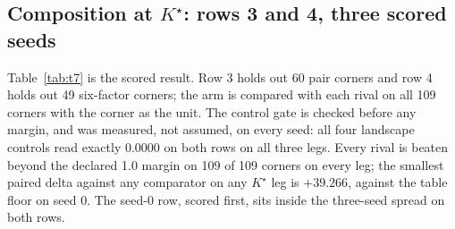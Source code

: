 \documentclass{article} %
\newcommand{\Kstar}{\ensuremath{K^{\star}}}
\begin{document}
\subsection{Composition at $\Kstar$: rows 3 and 4, three scored seeds}
\label{sec:shapes-t7}

Table~\ref{tab:t7} is the scored result. Row 3 holds out 60 pair corners and row 4 holds out
49 six-factor corners; the arm is compared with each rival on all 109 corners with the corner
as the unit. %
The control gate is checked before any margin, and was measured, not assumed, on every seed:
all four landscape controls read exactly 0.0000 on both rows on all three legs.
Every rival is beaten beyond the declared 1.0 margin on 109 of 109 corners on every leg; the
smallest paired delta against any comparator on any $\Kstar$ leg is $+39.266$, against the
table floor on seed 0. %
The seed-0 row, scored first, sits inside the three-seed spread on both rows.
\end{document}
